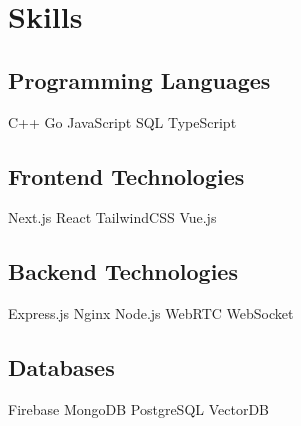\documentclass[]{deedy-resume-openfont}
\begin{document}
\begin{minipage}[t]{0.33\textwidth}


\sectionsep
\section{Skills}
\subsection{Programming Languages}
C++ \textbullet{} Go \textbullet{} JavaScript \textbullet{} SQL \textbullet{} TypeScript

\vspace{10pt}

\subsection{Frontend Technologies}
Next.js \textbullet{} React \textbullet{} TailwindCSS \textbullet{} Vue.js

\vspace{10pt}

\subsection{Backend Technologies}
Express.js \textbullet{} Nginx \textbullet{} Node.js \textbullet{} WebRTC \textbullet{} WebSocket

\vspace{10pt}

\subsection{Databases}
Firebase \textbullet{} MongoDB \textbullet{} PostgreSQL \textbullet{} VectorDB


\end{minipage}
\end{document}
